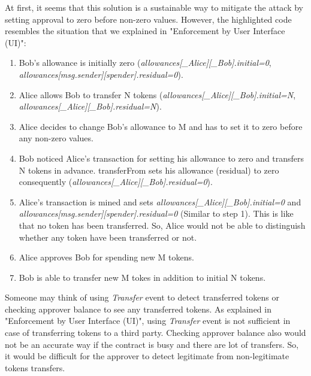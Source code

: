 At first, it seems that this solution is a sustainable way to mitigate the attack by setting approval to zero before non-zero values. However, the highlighted code resembles the situation that we explained in "Enforcement by User Interface (UI)":
\begin{enumerate}
	\item Bob’s allowance is initially zero (\textit{allowances[\_Alice][\_Bob].initial=0}, \textit{allowances[msg.sender][spender].residual=0}).
	\item Alice allows Bob to transfer N tokens (\textit{allowances[\_Alice][\_Bob].initial=N}, \textit{allowances[\_Alice][\_Bob].residual=N}).
	\item Alice decides to change Bob’s allowance to M and has to set it to zero before any non-zero values.
	\item Bob noticed Alice’s transaction for setting his allowance to zero and transfers N tokens in advance. transferFrom sets his allowance (residual) to zero consequently (\textit{allowances[\_Alice][\_Bob].residual=0}).
	\item Alice’s transaction is mined and sets \textit{allowances[\_Alice][\_Bob].initial=0} and \textit{allowances[msg.sender][spender].residual=0} (Similar to step 1). This is like that no token has been transferred. So, Alice would not be able to distinguish whether any token have been transferred or not.
	\item Alice approves Bob for spending new M tokens.
	\item Bob is able to transfer new M tokes in addition to initial N tokens.\newline
\end{enumerate}
Someone may think of using \textit{Transfer} event to detect transferred tokens or checking approver balance to see any transferred tokens. As explained in "Enforcement by User Interface (UI)", using \textit{Transfer} event is not sufficient in case of transferring tokens to a third party. Checking approver balance also would not be an accurate way if the contract is busy and there are lot of transfers. So, it would be difficult for the approver to detect legitimate from non-legitimate tokens transfers.

